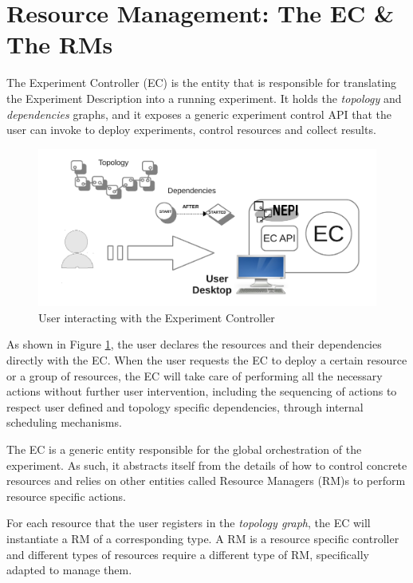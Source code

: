 \section{Resource Management: The EC \& The RMs}

The Experiment Controller (EC) is the entity that is responsible for 
translating the Experiment Description into a running experiment.
It holds the \emph{topology} and \emph{dependencies} graphs, and it 
exposes a generic experiment control API that the user can 
invoke to deploy experiments, control resources and collect results. 

\begin{figure}[h]
  \centering
  \includegraphics[width=\textwidth]{intro_ec}
  \caption{User interacting with the Experiment Controller}
  \label{fig:intro_ec}
\end{figure}

As shown in Figure \ref{fig:intro_ec}, the user declares the resources and
their dependencies directly with the EC. 
When the user requests the EC to deploy a certain resource or a
group of resources, the EC will take care of performing all the necessary 
actions without further user intervention, including the sequencing of 
actions to respect user defined and topology specific dependencies, 
through internal scheduling mechanisms. 

The EC is a generic entity responsible for the global orchestration of
the experiment. As such, it abstracts itself from the details of how to
control concrete resources and relies on other entities called Resource Managers 
(RM)s to perform resource specific actions. 

For each resource that the user registers in the \emph{topology graph}, the EC
will instantiate a RM of a corresponding type. A RM is a resource specific
controller and different types of resources require a different type of
RM, specifically adapted to manage them.

